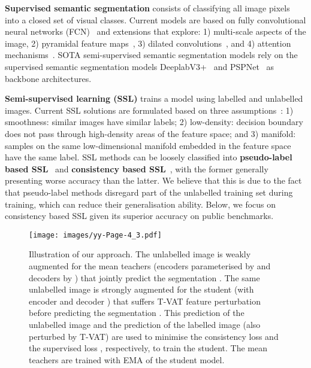 \documentclass[10pt,twocolumn,letterpaper]{article}
\begin{document}
\noindent \textbf{Supervised semantic segmentation} consists of classifying all image pixels into a closed set of visual classes. 
Current models are based on fully convolutional neural networks (FCN)~\cite{long2015fully,badrinarayanan2017segnet, minaee2021image} and extensions that explore: 1) multi-scale  aspects of the image\cite{dai2015convolutional, lin2016efficient}, 
2) pyramidal feature maps~\cite{zhao2017pyramid, ghiasi2016laplacian, he2019adaptive}, 3) dilated convolutions~\cite{yu2015multi, chen2018encoder, chen2017rethinking}, and 4) attention mechanisms~\cite{chen2016attention, li2019expectation}.  
SOTA semi-supervised semantic segmentation models rely on the supervised semantic segmentation models DeeplabV3+~\cite{chen2017deeplab} and 
PSPNet~\cite{zhao2017pyramid} as backbone architectures. 




\noindent  \textbf{Semi-supervised learning (SSL)} trains a model using labelled and unlabelled images.
Current SSL solutions are formulated based on three assumptions~\cite{van2020survey}: 1) smoothness: similar images have similar labels; 2) low-density: decision boundary does not pass through high-density areas of the feature space; and 3) manifold: samples on the same low-dimensional manifold embedded in the feature space have the same label.
SSL methods can be loosely classified  into \textbf{pseudo-label based SSL}~\cite{berthelot2019mixmatch, sohn2020fixmatch, 9207304} and \textbf{consistency based SSL}~\cite{laine2016temporal,tarvainen2017mean, polyak1992acceleration}, with 
the former generally presenting worse accuracy than the latter. We believe that this is due to the fact that pseudo-label methods disregard part of the unlabelled training set during training, which can reduce their generalisation ability.
Below, we focus on consistency based SSL given its superior accuracy on public benchmarks.







\begin{figure*}[t!]
    \centering
    \hspace*{1.2cm}\texttt{[image: images/yy-Page-4\_3.pdf]}
    \caption{Illustration of our approach. The unlabelled image  is weakly augmented for the mean teachers (encoders parameterised by  and decoders by ) that jointly predict the segmentation .
    The same unlabelled image 
    is strongly augmented for the student (with encoder  and decoder ) that suffers  T-VAT feature perturbation before predicting the segmentation .
    This prediction of the unlabelled image and the prediction  of the labelled image  (also perturbed by T-VAT) are used to minimise the consistency loss  and the supervised loss , respectively, to train the student. The mean teachers are trained with EMA of the student model. 
}
\vspace{-10pt}
\end{figure*}
\end{document}
